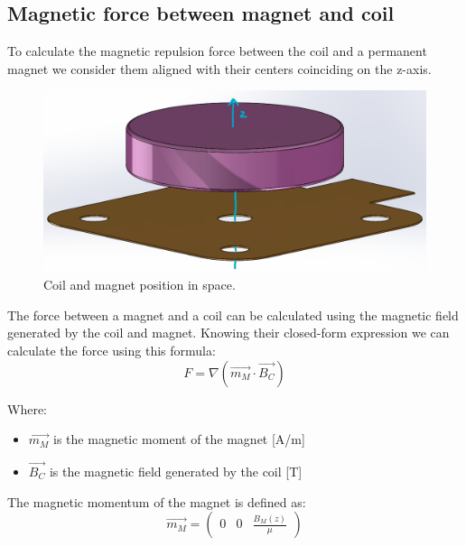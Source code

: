 \subsection{Magnetic force between magnet and coil}
To calculate the magnetic repulsion force between the coil and a permanent magnet we consider them aligned with their centers coinciding on the z-axis.
\begin{figure}
    \centering
    \includegraphics[scale=0.4]{Chapters/Chapter2/Modelling_of_Entire_System/Figures/coil_magnet.png} %
    \caption[Coil-Magnet position]{Coil and magnet position in space.}
    \label{fig:Coil-Magnet position}
\end{figure}

The force between a magnet and a coil can be calculated using the magnetic field generated by the coil and magnet.
Knowing their closed-form expression we can calculate the force using this formula:
\begin{equation}
    F = \nabla (\overrightarrow{m_M} \cdot \overrightarrow{B_C}) %
\end{equation}

Where: 
\begin{itemize}
    \item $\overrightarrow{m_M}$ is the magnetic moment of the magnet [A/m]
    \item $\overrightarrow{B_C}$ is the magnetic field generated by the coil [T]
\end{itemize}

The magnetic momentum of the magnet is defined as:
\begin{equation}
    \overrightarrow{m_M} = 
    \begin{pmatrix}
        0 & 0 & \frac{B_M(z)}{\mu}
    \end{pmatrix}
\end{equation}

